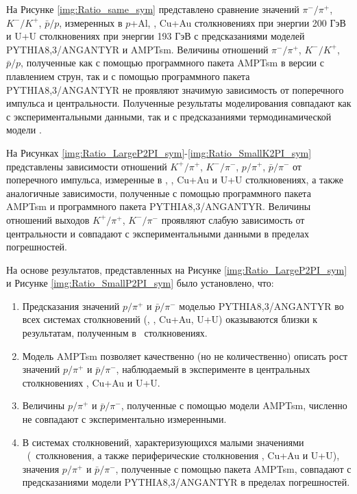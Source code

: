 На Рисунке \ref{img:Ratio_same_sym} представлено сравнение значений $\pi^{-}/\pi^{+}$, $K^{-}/K^{+}$, $\bar{p}/p$, измеренных в $p$+Al, \heau, Cu+Au столкновениях при энергии 200 ГэВ и U+U столкновениях при энергии 193 ГэВ с предсказаниями моделей PYTHIA8,3/ANGANTYR и AMPTsm. Величины отношений $\pi^{-}/\pi^{+}$, $K^{-}/K^{+}$, $\bar{p}/p$, полученные как с помощью программного пакета AMPTsm в версии с плавлением струн, так и с помощью программного пакета PYTHIA8,3/ANGANTYR не проявляют значимую зависимость от поперечного импульса и центральности. Полученные результаты моделирования совпадают как с экспериментальными данными, так и с предсказаниями термодинамической модели \cite{PPG026, ThermalisationRHIC}.

На Рисунках \ref{img:Ratio_LargeP2PI_sym}-\ref{img:Ratio_SmallK2PI_sym} представлены зависимости отношений $K^{+}/\pi^{+}$, $K^{-}/\pi^{-}$, $p/\pi^{+}$, $\bar{p}/\pi^{-}$ от поперечного импульса, измеренные в \pal, \heau, Cu+Au и U+U столкновениях, а также аналогичные зависимости, полученные с помощью программного пакета AMPTsm и  программного пакета PYTHIA8,3/ANGANTYR.
Величины отношений выходов $K^{+}/\pi^{+}$, $K^{-}/\pi^{-}$ проявляют слабую зависимость от центральности и совпадают с экспериментальными данными в пределах погрешностей. 

На основе результатов, представленных на Рисунке \ref{img:Ratio_LargeP2PI_sym} и Рисунке \ref{img:Ratio_SmallP2PI_sym} было установлено, что:

\begin{enumerate}
\item Предсказания значений $p/\pi^{+}$ и $\bar{p}/\pi^{-}$ моделью PYTHIA8,3/ANGANTYR во всех системах столкновений (\pal, \heau, Cu+Au, U+U) оказываются близки к результатам, полученным в \pp \ столкновениях. 
\item Модель AMPTsm позволяет качественно (но не количественно) описать рост значений $p/\pi^{+}$ и $\bar{p}/\pi^{-}$, наблюдаемый в эксперименте в центральных столкновениях \heau, Cu+Au и U+U.
\item Величины $p/\pi^{+}$ и $\bar{p}/\pi^{-}$, полученные с помощью модели AMPTsm, численно не совпадают с экспериментально измеренными.
\item В системах столкновений, характеризующихся малыми значениями \Npart \ (\pal \ столкновения, а также периферические столкновения \heau, Cu+Au и U+U), значения $p/\pi^{+}$ и $\bar{p}/\pi^{-}$, полученные с помощью пакета AMPTsm, совпадают с предсказаниями модели PYTHIA8,3/ANGANTYR в пределах погрешностей.
\end{enumerate}

